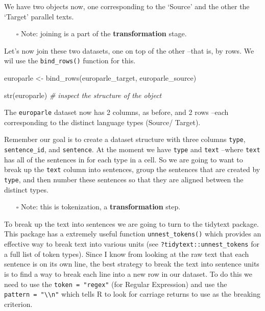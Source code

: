 \documentclass[
  letterpaper,
  DIV=11,
  numbers=noendperiod]{scrreport}
\newenvironment{Shaded}{\begin{snugshade}}{\end{snugshade}}
\newcommand{\CommentTok}[1]{\textcolor[rgb]{0.00,0.00,0.00}{\textit{#1}}}
\newcommand{\FunctionTok}[1]{\textcolor[rgb]{0.00,0.00,0.00}{#1}}
\newcommand{\NormalTok}[1]{\textcolor[rgb]{0.00,0.00,0.00}{#1}}
\newcommand{\OtherTok}[1]{\textcolor[rgb]{0.00,0.00,0.00}{#1}}
\providecommand{\tightlist}{%
  \setlength{\itemsep}{0pt}\setlength{\parskip}{0pt}}\usepackage{longtable,booktabs,array}
\theoremstyle{definition}
\theoremstyle{remark}
\begin{document}
We have two objects now, one corresponding to the `Source' and the other
the `Target' parallel texts.

\begin{itemize}
\tightlist
\item[$\square$]
  Note: joining is a part of the \textbf{transformation} stage.
\end{itemize}

Let's now join these two datasets, one on top of the other --that is, by
rows. We wil use the \texttt{bind\_rows()} function for this.

\begin{Shaded}
\begin{Highlighting}[]
\NormalTok{europarle }\OtherTok{\textless{}{-}}
  \FunctionTok{bind\_rows}\NormalTok{(europarle\_target, europarle\_source)}

\FunctionTok{str}\NormalTok{(europarle) }\CommentTok{\# inspect the structure of the object}
\end{Highlighting}
\end{Shaded}

The \texttt{europarle} dataset now has 2 columns, as before, and 2 rows
--each corresponding to the distinct language types (Source/ Target).

Remember our goal is to create a dataset structure with three columns
\texttt{type}, \texttt{sentence\_id}, and \texttt{sentence}. At the
moment we have \texttt{type} and \texttt{text} --where \texttt{text} has
all of the sentences in for each type in a cell. So we are going to want
to break up the \texttt{text} column into sentences, group the sentences
that are created by \texttt{type}, and then number these sentences so
that they are aligned between the distinct types.

\begin{itemize}
\tightlist
\item[$\square$]
  Note: this is tokenization, a \textbf{transformation} step.
\end{itemize}

To break up the text into sentences we are going to turn to the tidytext
package. This package has a extremely useful function
\texttt{unnest\_tokens()} which provides an effective way to break text
into various units (see \texttt{?tidytext::unnest\_tokens} for a full
list of token types). Since I know from looking at the raw text that
each sentence is on its own line, the best strategy to break the text
into sentence units is to find a way to break each line into a new row
in our dataset. To do this we need to use the \texttt{token\ =\ "regex"}
(for Regular Expression) and use the
\texttt{pattern\ =\ "\textbackslash{}\textbackslash{}n"} which tells R
to look for carriage returns to use as the breaking criterion.
\end{document}
